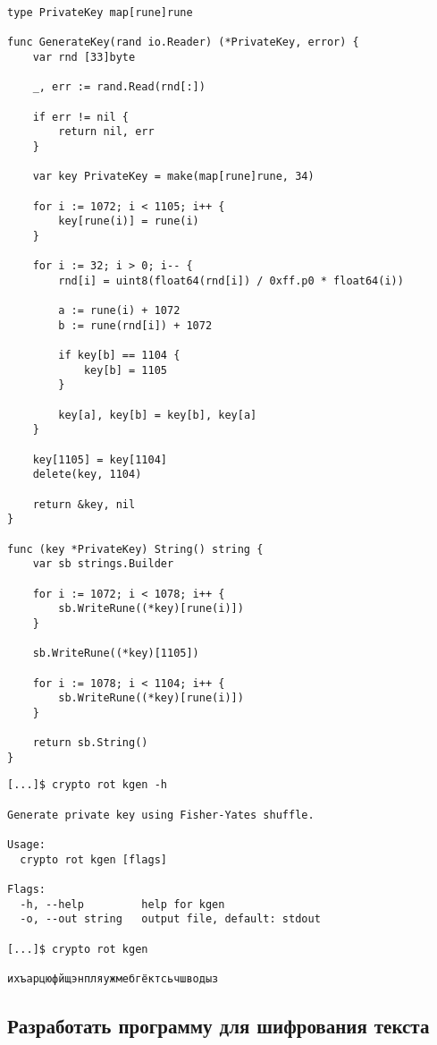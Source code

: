 \documentclass[12pt, a4paper]{article}
\begin{document}
\begin{verbatim}
type PrivateKey map[rune]rune

func GenerateKey(rand io.Reader) (*PrivateKey, error) {
	var rnd [33]byte

	_, err := rand.Read(rnd[:])

	if err != nil {
		return nil, err
	}

	var key PrivateKey = make(map[rune]rune, 34)

	for i := 1072; i < 1105; i++ {
		key[rune(i)] = rune(i)
	}

	for i := 32; i > 0; i-- {
		rnd[i] = uint8(float64(rnd[i]) / 0xff.p0 * float64(i))

		a := rune(i) + 1072
		b := rune(rnd[i]) + 1072

		if key[b] == 1104 {
			key[b] = 1105
		}

		key[a], key[b] = key[b], key[a]
	}

	key[1105] = key[1104]
	delete(key, 1104)

	return &key, nil
}

func (key *PrivateKey) String() string {
	var sb strings.Builder

	for i := 1072; i < 1078; i++ {
		sb.WriteRune((*key)[rune(i)])
	}

	sb.WriteRune((*key)[1105])

	for i := 1078; i < 1104; i++ {
		sb.WriteRune((*key)[rune(i)])
	}

	return sb.String()
}
\end{verbatim}

\begin{verbatim}
[...]$ crypto rot kgen -h

Generate private key using Fisher-Yates shuffle.

Usage:
  crypto rot kgen [flags]

Flags:
  -h, --help         help for kgen
  -o, --out string   output file, default: stdout

[...]$ crypto rot kgen

ихъарцюфйщэнпляужмебгёктсьчшводыз
\end{verbatim}

\subsection{Разработать программу для шифрования текста}
\end{document}
